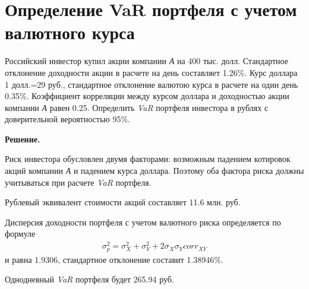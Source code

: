 \documentclass[12pt,a4paper]{article}
\begin{document}
\section{Определение VaR портфеля с учетом валютного курса}
\begin{taskrus}
Российский инвестор купил акции компании \textit{А} на 400 тыс. долл. Стандартное отклонение доходности акции в расчете на день составляет 1.26\%. Курс доллара 1 долл.=29 руб., стандартное отклонение валютою курса в расчете на один день 0.35\%. Коэффициент корреляции между курсом доллара и доходностью акции компании \textit{А} равен 0.25. Определить \textit{VaR }портфеля инвестора в рублях с доверительной вероятностью 95\%.

\textbf{Решение.}

Риск инвестора обусловлен двумя факторами: возможным падением котировок акций компании \textit{А} и падением курса доллара. Поэтому оба фактора риска должны учитываться при расчете \textit{VaR }портфеля.

Рублевый эквивалент стоимости акций составляет 11.6 млн. руб.

Дисперсия доходности портфеля с учетом валютного риска определяется по формуле 
\begin{align}
\label{riskXYcorrCurrency}
\sigma_p^2=\sigma_X^2+\sigma_Y^2+2\sigma_X\sigma_Y corr_{XY}
\end{align}
и равна 1.9306, стандартное отклонение составит 1.38946\%.

Однодневный \textit{VaR} портфеля будет 265.94 руб.


\end{taskrus}
\end{document}
